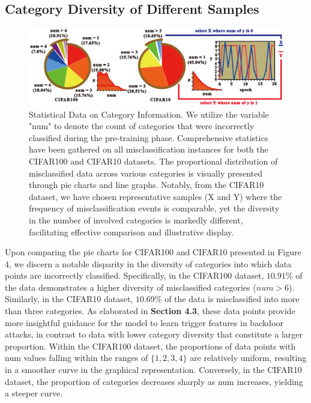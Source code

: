 \documentclass{article}
\begin{document}
\subsection{Category Diversity of Different Samples}
\begin{figure}[h]
\centering
\includegraphics[width=0.98\linewidth]{Styles/figures/CIFAR.pdf}
\caption{Statistical Data on Category Information. We utilize the variable "num" to denote the count of categories that were incorrectly classified during the pre-training phase. Comprehensive statistics have been gathered on all misclassification instances for both the CIFAR100 and CIFAR10 datasets. The proportional distribution of misclassified data across various categories is visually presented through pie charts and line graphs. Notably, from the CIFAR10 dataset, we have chosen representative samples (X and Y) where the frequency of misclassification events is comparable, yet the diversity in the number of involved categories is markedly different, facilitating effective comparison and illustrative display.} 
\end{figure}
Upon comparing the pie charts for CIFAR100 and CIFAR10 presented in Figure 4, we discern a notable disparity in the diversity of categories into which data points are incorrectly classified. Specifically, in the CIFAR100 dataset, \(10.91\%\) of the data demonstrates a higher diversity of misclassified categories (\(num > 6\)). Similarly, in the CIFAR10 dataset, \(10.69\%\) of the data is misclassified into more than three categories. As elaborated in \textbf{Section 4.3}, these data points provide more insightful guidance for the model to learn trigger features in backdoor attacks, in contrast to data with lower category diversity that constitute a larger proportion. Within the CIFAR100 dataset, the proportions of data points with num values falling within the ranges of \(\{1, 2, 3, 4\}\) are relatively uniform, resulting in a smoother curve in the graphical representation. Conversely, in the CIFAR10 dataset, the proportion of categories decreases sharply as num increases, yielding a steeper curve.
\end{document}
